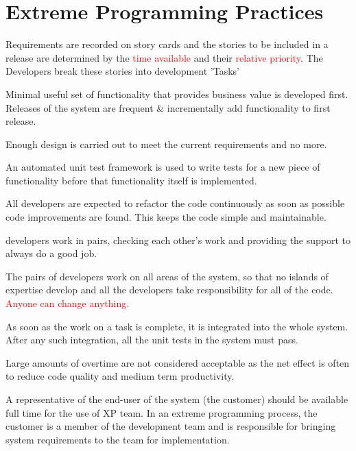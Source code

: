 \documentclass{report}
\newcommand{\textr}[1]{\textcolor{red}{#1}}
\begin{document}
\section{Extreme Programming Practices}
\begin{description}[style=multiline,leftmargin=12em]
  \item [Incremental planning] Requirements are recorded on story cards and the stories to be included in a release are determined by the \textr{time available} and their \textr{relative priority}. The Developers break these stories into development 'Tasks'
    \item [Small releases] Minimal useful set of functionality that provides business value is developed first.\newline
    Releases of the system are frequent \& incrementally add functionality to first release.
  \item [Simple design] Enough design is carried out to meet the current requirements and no more.
  \item [Test-first development] An automated unit test framework is used to write tests for a new piece of functionality before that functionality itself is implemented.
  \item [Refactoring] All developers are expected to refactor the code continuously as soon as possible code improvements are found. This keeps the code simple and maintainable.
  \item [Pair programming] developers work in pairs, checking each other's work and providing the support to always do a good job.
  \item [Collective ownership] The pairs of developers work on all areas of the system, so that no islands of expertise develop and all the developers take responsibility for all of the code. \textr{Anyone can change anything.}
  \item [Continuous integration] As soon as the work on a task is complete, it is integrated into the whole system. After any such integration, all the unit tests in the system must pass.
  \item [Sustainable pace] Large amounts of overtime are not considered acceptable as the net effect is often to reduce code quality and medium term productivity.
  \item [On-site customer] A representative of the end-user of the system (the customer) should be available full time for the use of XP team. In an extreme programming process, the customer is a member of the development team and is responsible for bringing system requirements to the team for implementation.
\end{description}
\end{document}
